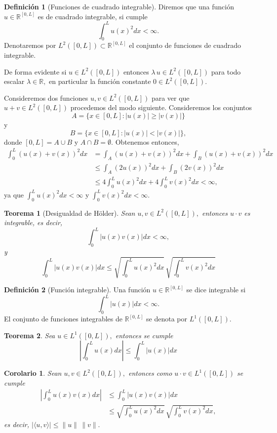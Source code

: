 \documentclass[10pt,handout]{beamer}
\theoremstyle{plain} %
\newtheorem{thm}{Teorema}
\theoremstyle{plain} %
\theoremstyle{plain} %
\theoremstyle{plain} %
\newtheorem{cory}{Corolario}
\theoremstyle{definition}
\newtheorem{defn}{Definici\'on}
\theoremstyle{example}
\theoremstyle{example}
\theoremstyle{remark}
\theoremstyle{remark}
\begin{document}
\begin{frame}
\begin{defn}[Funciones de cuadrado integrable]
Diremos que una función $u \in \mathbb{R}^{[0,L]}$ es de cuadrado integrable, si cumple
$$
\int_0^L u(x)^2 dx < \infty.
$$
Denotaremos por $L^2([0,L]) \subset \mathbb{R}^{[0,L]}$ el conjunto de funciones de cuadrado integrable. 
\end{defn}
De forma evidente si $u \in L^2([0,L])$ entonces $\lambda\, u \in  L^2([0,L])$ para todo escalar
$\lambda \in \mathbb{R},$ en particular la función constante $0 \in   L^2([0,L]).$
\end{frame}

\begin{frame}
Consideremos dos funciones $u,v \in L^2([0,L])$ para ver que $u+v \in L^2([0,L])$ procedemos
del modo siguiente. Consideremos los conjuntos
$$
A = \{x \in [0,L]: |u(x)| \ge |v(x)|\} 
$$
y
$$
B = \{x \in [0,L]: |u(x)| < |v(x)|\},
$$
donde $[0,L] = A \cup B$ y $A \cap B = \emptyset.$ Obtenemos entonces,
\begin{align*}
\int_0^L (u(x)+v(x))^2 dx & = \int_A (u(x)+v(x))^2 dx + \int_B (u(x)+v(x))^2 dx \\ 
& \le \int_A (2u(x))^2 dx +  \int_B (2v(x))^2 dx \\ 
& \le 4 \int_0^L u(x)^2 dx + 4 \int_0^L v(x)^2 dx <  \infty,
\end{align*}
ya que $\int_0^L u(x)^2 dx < \infty$ y $\int_0^L v(x)^2 dx < \infty.$
\end{frame}


\begin{frame}
\begin{thm}[Desigualdad de H\"older]
Sean $u,v \in L^2([0,L]),$ entonces $u\cdot v$ es integrable, es decir, 
$$
\int_0^L |u(x)v(x)| dx < \infty,
$$
y
$$
\int_0^L |u(x)v(x)| dx \le
\sqrt{\int_0^L u(x)^2 dx} \, \sqrt{\int_0^L v(x)^2 dx}
$$
\end{thm}
\begin{defn}[Función integrable]
Una función $u \in \mathbb{R}^{[0,L]}$ se dice integrable si
$$
\int_0^L |u(x)|dx < \infty.
$$
El conjunto de funciones integrables de $\mathbb{R}^{[0,L]}$ se denota por $L^1([0,L]).$
\end{defn}
\end{frame}

\begin{frame}
\begin{thm}
Sea $u\in L^1([0,L]),$ entonces se cumple
$$
\left| \int_0^L u(x) dx \right| \le \int_0^L |u(x)| dx
$$ 
\end{thm}
\begin{cory}
Sean $u,v \in L^2([0,L]),$ entonces como $u \cdot v \in L^1([0,L])$ se cumple 
\begin{align*}
\left| \int_0^L u(x)v(x) dx \right| & \le \int_0^L |u(x)v(x)| dx \\ 
& \le \sqrt{\int_0^L u(x)^2 dx} \, \sqrt{\int_0^L v(x)^2 dx},
\end{align*}
es decir, $|\langle u, v \rangle| \le \|u\| \, \|v\|.$
\end{cory}
\end{frame}
\end{document}
